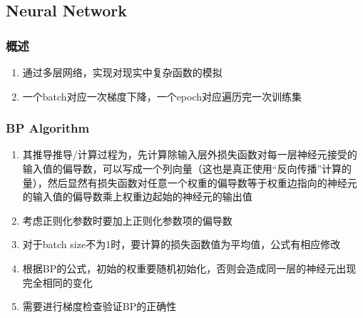 \documentclass[onecolumn]{article}
\begin{document}
    \subsection{Neural Network}
        \subsubsection{概述}
            \noindent
            \begin{enumerate}
                \item 通过多层网络，实现对现实中复杂函数的模拟
                \item 一个batch对应一次梯度下降，一个epoch对应遍历完一次训练集
            \end{enumerate}
        \subsubsection{BP Algorithm}
            \noindent
            \begin{enumerate}
                \item 其推导推导/计算过程为，先计算除输入层外损失函数对每一层神经元接受的输入值的偏导数，可以写成一个列向量（这也是真正使用“反向传播”计算的量），然后显然有损失函数对任意一个权重的偏导数等于权重边指向的神经元的输入值的偏导数乘上权重边起始的神经元的输出值
                \item 考虑正则化参数时要加上正则化参数项的偏导数
                \item 对于batch size不为1时，要计算的损失函数值为平均值，公式有相应修改
                \item 根据BP的公式，初始的权重要随机初始化，否则会造成同一层的神经元出现完全相同的变化
                \item 需要进行梯度检查验证BP的正确性
            \end{enumerate}
\end{document}
